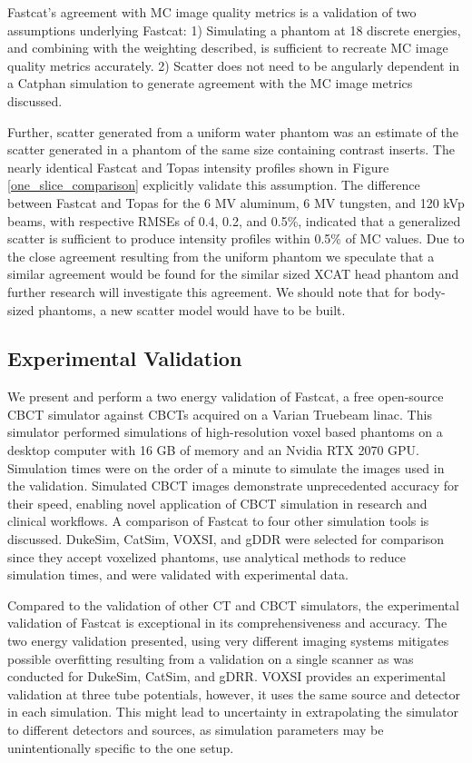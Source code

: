 Fastcat's agreement with MC image quality metrics is a validation of two assumptions underlying Fastcat: 1) Simulating a phantom at 18 discrete energies, and combining with the weighting described, is sufficient to recreate MC image quality metrics accurately. 2) Scatter does not need to be angularly dependent in a Catphan simulation to generate agreement with the MC image metrics discussed.

Further, scatter generated from a uniform water phantom was an estimate of the scatter generated in a phantom of the same size containing contrast inserts. The nearly identical Fastcat and Topas intensity profiles shown in Figure \ref{one_slice_comparison} explicitly validate this assumption. The difference between Fastcat and Topas for the 6 MV aluminum, 6 MV tungsten, and 120 kVp beams, with respective RMSEs of 0.4, 0.2, and 0.5\%, indicated that a generalized scatter is sufficient to produce intensity profiles within 0.5\% of MC values. Due to the close agreement resulting from the uniform phantom we speculate that a similar agreement would be found for the similar sized XCAT head phantom and further research will investigate this agreement. We should note that for body-sized phantoms, a new scatter model would have to be built.

\subsection{Experimental Validation}

We present and perform a two energy validation of Fastcat, a free open-source CBCT simulator against CBCTs acquired on a Varian Truebeam linac. This simulator performed simulations of high-resolution voxel based phantoms on a desktop computer with 16 GB of memory and an Nvidia RTX 2070 GPU. Simulation times were on the order of a minute to simulate the images used in the validation. Simulated CBCT images demonstrate unprecedented accuracy for their speed, enabling novel application of CBCT simulation in research and clinical workflows. A comparison of Fastcat to four other simulation tools is discussed. DukeSim, CatSim, VOXSI, and gDDR were selected for comparison since they accept voxelized phantoms, use analytical methods to reduce simulation times, and were validated with experimental data.

Compared to the validation of other CT and CBCT simulators, the experimental validation of Fastcat is exceptional in its comprehensiveness and accuracy. The two energy validation presented, using very different imaging systems mitigates possible overfitting resulting from a validation on a single scanner as was conducted for DukeSim, CatSim, and gDRR. VOXSI provides an experimental validation at three tube potentials, however, it uses the same source and detector in each simulation. This might lead to uncertainty in extrapolating the simulator to different detectors and sources, as simulation parameters may be unintentionally specific to the one setup.


